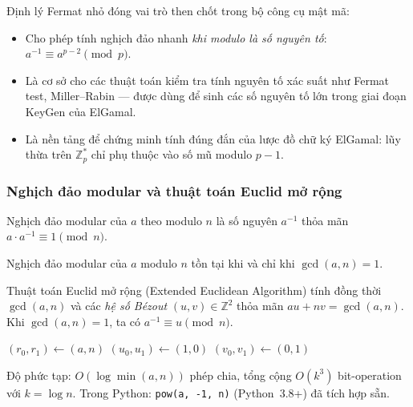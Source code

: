 \documentclass[../DoAn.tex]{subfiles}
\begin{document}
Định lý Fermat nhỏ đóng vai trò then chốt trong bộ công cụ mật mã:
\begin{itemize}[leftmargin=*]
	\item Cho phép tính nghịch đảo nhanh \emph{khi modulo là số nguyên tố}: $a^{-1} \equiv a^{p-2} \pmod{p}$.
	\item Là cơ sở cho các thuật toán kiểm tra tính nguyên tố xác suất như Fermat test, Miller--Rabin --- được dùng để sinh các số nguyên tố lớn trong giai đoạn KeyGen của ElGamal.
	\item Là nền tảng để chứng minh tính đúng đắn của lược đồ chữ ký ElGamal: lũy thừa trên $\mathbb{Z}_p^*$ chỉ phụ thuộc vào số mũ modulo $p-1$.
\end{itemize}

\subsubsection{Nghịch đảo modular và thuật toán Euclid mở rộng}

\begin{definition}
Nghịch đảo modular của $a$ theo modulo $n$ là số nguyên $a^{-1}$ thỏa mãn $a \cdot a^{-1} \equiv 1 \pmod{n}$.
\end{definition}

\begin{theorem}
Nghịch đảo modular của $a$ modulo $n$ tồn tại khi và chỉ khi $\gcd(a, n) = 1$.
\end{theorem}

Thuật toán Euclid mở rộng (Extended Euclidean Algorithm) tính đồng thời $\gcd(a, n)$ và các \emph{hệ số Bézout} $(u, v) \in \mathbb{Z}^2$ thỏa mãn $au + nv = \gcd(a, n)$. Khi $\gcd(a, n) = 1$, ta có $a^{-1} \equiv u \pmod{n}$.

\begin{algorithm}[H]
\caption{Thuật toán Euclid mở rộng}
\label{alg:extgcd}
$(r_0, r_1) \gets (a, n)$\;
$(u_0, u_1) \gets (1, 0)$\;
$(v_0, v_1) \gets (0, 1)$\;
\;
\end{algorithm}

Độ phức tạp: $O(\log \min(a, n))$ phép chia, tổng cộng $O(k^3)$ bit-operation với $k = \log n$. Trong Python: \texttt{pow(a, -1, n)} (Python~3.8+) đã tích hợp sẵn.
\end{document}
